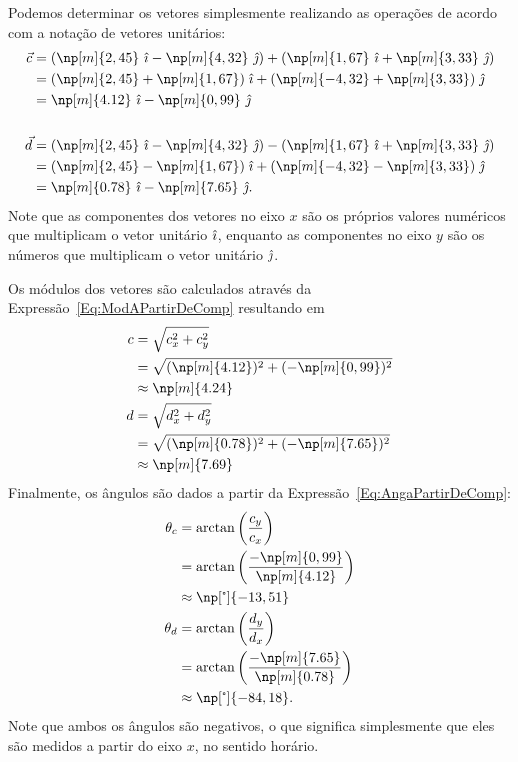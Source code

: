 Podemos determinar os vetores simplesmente realizando as operações de acordo com a notação de vetores unitários:
\begin{align}
    \vec{c} &= (\np[m]{2,45}~\versi - \np[m]{4,32}~\versj) + (\np[m]{1,67}~\versi + \np[m]{3,33}~\versj) \\
    &= (\np[m]{2,45} + \np[m]{1,67})\;\versi + (\np[m]{-4,32} + \np[m]{3,33})\;\versj \\
    &= \np[m]{4.12}~\versi - \np[m]{0,99}~\versj \\
    \\
    \vec{d} &= (\np[m]{2,45}~\versi - \np[m]{4,32}~\versj) - (\np[m]{1,67}~\versi + \np[m]{3,33}~\versj) \\
    &= (\np[m]{2,45} - \np[m]{1,67})\;\versi + (\np[m]{-4,32} - \np[m]{3,33})\;\versj \\
    &= \np[m]{0.78}~\versi - \np[m]{7.65}~\versj.
\end{align}
%
Note que as componentes dos vetores no eixo $x$ são os próprios valores numéricos que multiplicam o vetor unitário $\hat{\imath}$, enquanto as componentes no eixo $y$ são os números que multiplicam o vetor unitário $\hat{\jmath}$.

Os módulos dos vetores são calculados através da Expressão~\eqref{Eq:ModAPartirDeComp} resultando em
\begin{align}
    c &= \sqrt{c_x^2 + c_y^2} \\
    &= \sqrt{(\np[m]{4.12})^2 +(- \np[m]{0,99})^2} \\
    &\approx \np[m]{4.24}
\\
    d &= \sqrt{d_x^2 + d_y^2} \\
    &= \sqrt{(\np[m]{0.78})^2 +(- \np[m]{7.65})^2} \\
    &\approx \np[m]{7.69}
\end{align}
%
Finalmente, os ângulos são dados a partir da Expressão~\eqref{Eq:AngaPartirDeComp}:
\begin{align}
    \theta_c &= \arctan\left(\frac{c_y}{c_x}\right) \\
    &= \arctan\left(\frac{- \np[m]{0,99}}{\np[m]{4.12}}\right) \\
    &\approx \np[\tcdegree]{-13,51}
    \\
    \theta_d &= \arctan\left(\frac{d_y}{d_x}\right) \\
    &= \arctan\left(\frac{- \np[m]{7.65}}{\np[m]{0.78}}\right) \\
    &\approx \np[\tcdegree]{-84,18}.
\end{align}
%
Note que ambos os ângulos são negativos, o que significa simplesmente que eles são medidos a partir do eixo $x$, no sentido horário.



